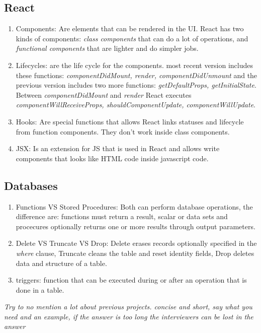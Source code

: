 \subsection{React}
\begin{multicols}{2}
\begin{enumerate}
\item Components: Are elements that can be rendered in the UI. React has two kinds of components: \emph{class components} that can do a lot of operations, and \emph{functional components} that are lighter and do simpler jobs.
\item Lifecycles: are the life cycle for the components. most recent version includes these functions: \emph{componentDidMount, render, componentDidUnmount} and the previous version includes two more functions: \emph{getDefaultProps, getInitialState}. Between \emph{componentDidMount} and \emph{render} React executes \emph{componentWillReceiveProps, shouldComponentUpdate, componentWillUpdate}.
\item Hooks: Are special functions that allows React links statuses and lifecycle from function components. They don't  work inside class components.
\item JSX: Is an extension for JS that is used in React and allows write components that looks like HTML code inside javascript code.
\end{enumerate}
\end{multicols}

\subsection{Databases}
\begin{multicols}{2}
\begin{enumerate}
\item Functions VS Stored Procedures: Both can perform database operations, the difference are: functions must return a result, scalar or data sets and procecures optionally returns one or more results through output parameters.
\item Delete VS Truncate VS Drop: Delete erases records optionally specified in the \emph{where} clause, Truncate cleans the table and reset identity fields, Drop deletes data and structure of a table.
\item triggers: function that can be executed during or after an operation that is done in a table.
\end{enumerate}
\emph{Try to no mention a lot about previous projects. concise and short, say what you need and an example, if the answer is too long the interviewers can be lost in the answer}
\end{multicols}

